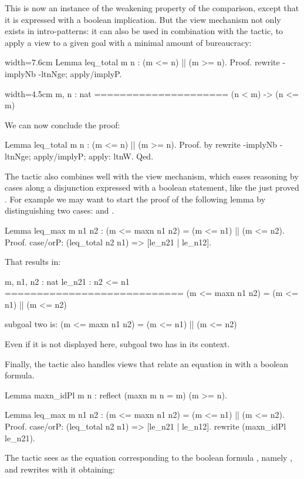 This is now an instance of the weakening property of the comparison,
except that it is expressed with a boolean implication. But the view
mechanism not only exists in intro-patterns: it can also be used in
combination with the  tactic, to apply a view to a given goal
with a minimal amount of bureaucracy:

\begin{coq-left}{}{width=7.6cm}
Lemma leq_total m n :
  (m <= n) || (m >= n).
Proof.
rewrite -implyNb -ltnNge; apply/implyP.
\end{coq-left}
\begin{coqout-right}{}{width=4.5cm}
m, n : nat
=====================
(n < m) -> (n <= m)
$~$
\end{coqout-right}

We can now conclude the proof:

\begin{coq}{}{}
Lemma leq_total m n : (m <= n) || (m >= n).
Proof. by rewrite -implyNb -ltnNge; apply/implyP; apply: ltnW. Qed.
\end{coq}

The  tactic also combines well with the view mechanism, which
eases reasoning by cases along a disjunction expressed with a boolean
statement, like the just proved .  For example we
may want to start the proof of the following lemma by distinguishing
two cases:  and .

\begin{coq}{}{}
Lemma leq_max m n1 n2 :
  (m <= maxn n1 n2) = (m <= n1) || (m <= n2).
Proof.
case/orP: (leq_total n2 n1) => [le_n21 | le_n12].
\end{coq}
That results in:

\begin{coqout}{}{}
m, n1, n2 : nat
le_n21 : n2 <= n1
============================
(m <= maxn n1 n2) = (m <= n1) || (m <= n2)

subgoal two is:
 (m <= maxn n1 n2) = (m <= n1) || (m <= n2)
\end{coqout}
Even if it is not displayed here, subgoal two has 
in its context.

Finally, the  tactic also handles views that relate an
equation in  with a boolean formula.

\begin{coq}{}{}
Lemma maxn_idPl {m n} : reflect (maxn m n = m) (m >= n).

Lemma leq_max m n1 n2 :
  (m <= maxn n1 n2) = (m <= n1) || (m <= n2).
Proof.
case/orP: (leq_total n2 n1) => [le_n21 | le_n12].
  rewrite (maxn_idPl le_n21).
\end{coq}
The tactic sees  as the equation corresponding
to the boolean formula , namely ,
and rewrites with it obtaining:

